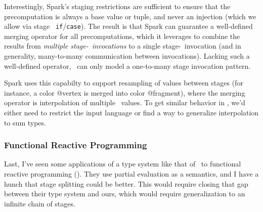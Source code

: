Interestingly, Spark's staging restrictions are sufficient to ensure 
that the precomputation is always a base value or tuple, and never an injection 
(which we allow via stage \bbone\ {\tt if}/{\tt case}).
The result is that Spark can guarantee a well-defined merging operator for all precomputations, 
which it leverages to combine the results from {\em multiple stage-\bbone\ invocations} to a single stage-\bbtwo\ invocation
(and in generality, many-to-many communication between invocations).
Lacking such a well-defined operator, \lang\ can only model a one-to-many stage invocation pattern.

Spark uses this capabilty to support resampling of values between stages (for instance, a color @vertex is merged into color @fragment), 
where the merging operator is interpolation of multiple \bbone\ values.  
To get similar behavior in \lang, we'd either need to restrict the input language
or find a way to generalize interpolation to sum types.

\subsubsection{Functional Reactive Programming}

Last, I've seen some applications of a type system like that of \lang\ to functional reactive programming (\cite{cave14}).
They use partial evaluation as a semantics,
and I have a hunch that stage splitting could be better.
This would require closing that gap between their type system and ours, which would require generalization to
an infinite chain of stages.
